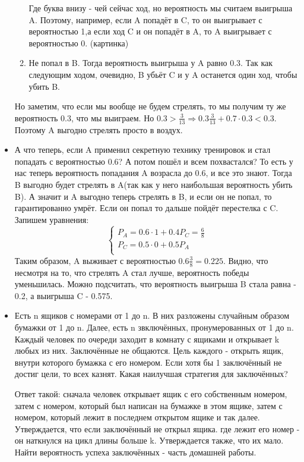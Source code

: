 \begin{itemize}
\begin{enumerate}
		Где буква внизу - чей сейчас ход, но вероятность мы считаем выигрыша A. Поэтому, например, если A попадёт в C, то он выигрывает с вероятностью 1,а если ход C и он попадёт в A, то A выигрывает с вероятностью 0. (картинка)
		\item Не попал в B. Тогда вероятность выигрыша у A равно 0.3. Так как следующим ходом, очевидно, B убьёт C и у A останется один ход, чтобы убить B.
	\end{enumerate}
	Но заметим, что если мы вообще не будем стрелять, то мы получим ту же вероятность 0.3, что мы выиграем. Но $0.3 > \frac{3}{13} \Rightarrow 
	0.3 \frac{3}{13} + 0.7 \cdot 0.3 < 0.3$. Поэтому A выгодно стрелять просто в воздух.
	\item А что теперь, если A применил секретную технику тренировок и стал попадать с вероятностью 0.6? А потом пошёл и всем похвастался? То есть у нас теперь вероятность попадания A возрасла до 0.6, и все это знают. Тогда B выгодно будет стрелять в A(так как у него наибольшая вероятность убить B). А значит и A выгодно теперь стрелять в B, и если он не попал, то гарантированно умрёт. Если он попал то дальше пойдёт перестелка с C. Запишем уравнения:
	\begin{equation*}
			\begin{cases}
				P_A = 0.6 \cdot 1 + 0.4 P_C = \frac{6}{8} \\
				P_C = 0.5 \cdot 0 + 0.5 P_A \\
			\end{cases}
		\end{equation*}			
		Таким образом, A выживает с вероятностью $0.6 \frac{3}{8} = 0.225$. Видно, что несмотря на то, что стрелять A стал лучше, вероятность победы уменьшилась. Можно подсчитать, что вероятность выигрыша B стала равна - 0.2, а выигрыша C - 0.575.
		
		\item Есть n ящиков с номерами от 1 до n. В них разложены случайным образом бумажки от 1 до n. Далее, есть n звключённых, пронумерованных от 1 до n. Каждый человек по очереди заходит в комнату с ящиками и открывает k любых из них. Заключённые не общаются. Цель каждого - открыть ящик, внутри которого бумажка с его номером. Если хотя бы 1 заключённый не достиг цели, то всех казнят. Какая наилучшая стратегия для заключённых?
		
		Ответ такой: сначала человек открывает ящик с его собственным номером, затем с номером, который был написан на бумажке в этом ящике, затем с номером, который лежит в последнем открытом ящике и так далее. Утверждается, что если заключённый не открыл ящика. где лежит его номер - он наткнулся на цикл длины больше k. Утверждается также, что их мало. Найти вероятность успеха заключённых - часть домашней работы.
\end{itemize}
